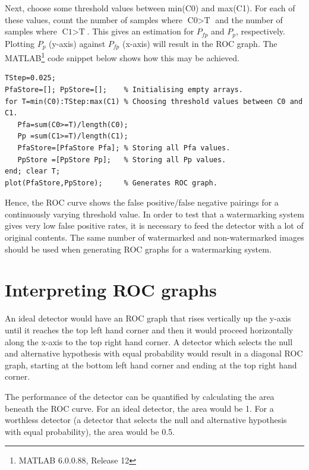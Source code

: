 \documentclass[12pt]{report}
\renewcommand{\baselinestretch}{1.5}
\begin{document}
Next, choose some threshold values between min(C0) and max(C1).
For each of these values, count the number of samples where $\mbox{C0} > \mbox{T}$ and the 
number of samples where $\mbox{C1} > \mbox{T}$. This gives an estimation for $P_{fp}$ and
$P_{p}$, respectively. Plotting $P_{p}$ (y-axis) against $P_{fp}$ (x-axis) 
will result in the ROC graph.
The MATLAB\footnote{MATLAB 6.0.0.88, Release 12} code snippet below shows how this may be achieved.
\noindent
\begin{minipage}[t]{15cm}
\footnotesize
\renewcommand{\baselinestretch}{1}
\begin{verbatim}
TStep=0.025; 
PfaStore=[]; PpStore=[];    % Initialising empty arrays.
for T=min(C0):TStep:max(C1) % Choosing threshold values between C0 and C1.
   Pfa=sum(C0>=T)/length(C0);
   Pp =sum(C1>=T)/length(C1);
   PfaStore=[PfaStore Pfa]; % Storing all Pfa values.
   PpStore =[PpStore Pp];   % Storing all Pp values.
end; clear T;
plot(PfaStore,PpStore);     % Generates ROC graph.
\end{verbatim}
\renewcommand{\baselinestretch}{1.5}
\normalsize
\end{minipage}

\vspace{0.5cm}
\par
Hence, the ROC curve shows the false positive/false negative pairings for a 
continuously varying threshold value.
In order to test that a watermarking system gives very low false positive rates,
it is necessary to feed the detector with a lot of original contents.
The same number of watermarked and non-watermarked images should be used when generating
ROC graphs for a watermarking system.

\section{Interpreting ROC graphs}
An ideal detector would have an ROC graph that rises vertically up the y-axis until it 
reaches the top left hand corner and then it would proceed horizontally along the x-axis to the 
top right hand corner. A detector which selects the null and alternative
hypothesis with equal probability would result in a diagonal ROC graph, starting at the
bottom left hand corner and ending at the top right hand corner.

The performance of the detector can be quantified by calculating the area beneath the 
ROC curve. For an ideal detector, the area would be 1. For a worthless detector (a detector
that selects the null and alternative
hypothesis with equal probability), the
area would be 0.5.
\end{document}
